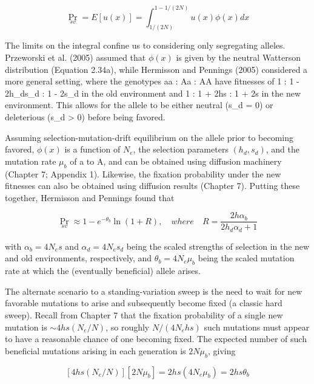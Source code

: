 \documentclass{article}
\begin{document}
\begin{equation}
\Pr_{sv}=E\left[u(x)\right]=\int_{1/(2N)}^{1-1/(2N)}u(x)\phi(x)dx
\tag{8.17a}
\label{eq:8_17a}
\end{equation}

The limits on the integral confine us to considering only segregating alleles. Przeworski et al. (2005) assumed that  $ \phi(x) $ is given by the neutral Watterson distribution (Equation 2.34a), while Hermisson and Pennings (2005) considered a more general setting, where the genotypes aa : Aa : AA have fitnesses of 1 : 1 - 2h_{d}s_{d} : 1 - 2s_{d} in the old environment and 1 : 1 + 2hs : 1 + 2s in the new environment. This allows for the allele to be either neutral (s_{d} = 0) or deleterious (s_{d} > 0) before being favored.

Assuming selection-mutation-drift equilibrium on the allele prior to becoming favored,  $ \phi(x) $ is a function of  $ N_e $, the selection parameters  $ (h_d, s_d) $, and the mutation rate  $ \mu_b $ of a to A, and can be obtained using diffusion machinery (Chapter 7; Appendix 1). Likewise, the fixation probability under the new fitnesses can also be obtained using diffusion results (Chapter 7). Putting these together, Hermisson and Pennings found that

\begin{equation}
\Pr_{sv}\approx1-e^{-\theta_{b}}\ln(1+R),\quad where\quad R=\frac{2h\alpha_{b}}{2h_{d}\alpha_{d}+1}
\tag{8.17b}
\label{eq:8_17b}
\end{equation}

with  $ \alpha_b = 4N_e s $ and  $ \alpha_d = 4N_e s_d $ being the scaled strengths of selection in the new and old environments, respectively, and  $ \theta_b = 4N_e \mu_b $ being the scaled mutation rate at which the (eventually beneficial) allele arises.

The alternate scenario to a standing-variation sweep is the need to wait for new favorable mutations to arise and subsequently become fixed (a classic hard sweep). Recall from Chapter 7 that the fixation probability of a single new mutation is  $ \sim4hs(N_e/N) $, so roughly  $ N/(4N_ehs) $ such mutations must appear to have a reasonable chance of one becoming fixed. The expected number of such beneficial mutations arising in each generation is  $ 2N\mu_b $, giving

\begin{equation}
\left[4h s(N_{e}/N)\right]\left[2N\mu_{b}\right]=2h s(4N_{e}\mu_{b})=2h s\theta_{b}
\tag{8.18a}
\label{eq:8_18a}
\end{equation}
\end{document}
